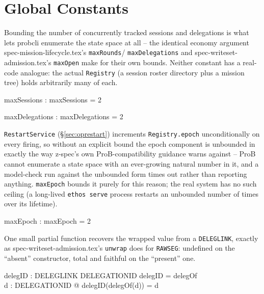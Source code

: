 \documentclass[a4paper,10pt,fleqn]{article}
\newcommand{\field}[1]{\texttt{#1}}
\begin{document}
\section{Global Constants}
\label{sec:constants}

Bounding the number of concurrently tracked sessions and delegations is
what lets probcli enumerate the state space at all -- the identical
economy argument spec-mission-lifecycle.tex's \field{maxRounds}/
\field{maxDelegations} and spec-writeset-admission.tex's \field{maxOpen}
make for their own bounds. Neither constant has a real-code analogue:
the actual \field{Registry} (a session roster directory plus a mission
tree) holds arbitrarily many of each.

\begin{axdef}
maxSessions : \nat
\where
maxSessions = 2
\end{axdef}

\begin{axdef}
maxDelegations : \nat
\where
maxDelegations = 2
\end{axdef}

\field{RestartService} (\S\ref{sec:oprestart}) increments
\field{Registry.epoch} unconditionally on every firing, so without an
explicit bound the epoch component is unbounded in exactly the way
z-spec's own ProB-compatibility guidance warns against -- ProB cannot
enumerate a state space with an ever-growing natural number in it, and
a model-check run against the unbounded form times out rather than
reporting anything. \field{maxEpoch} bounds it purely for this reason;
the real system has no such ceiling (a long-lived \field{ethos serve}
process restarts an unbounded number of times over its lifetime).

\begin{axdef}
maxEpoch : \nat
\where
maxEpoch = 2
\end{axdef}

One small partial function recovers the wrapped value from a
\field{DELEGLINK}, exactly as spec-writeset-admission.tex's
\field{unwrap} does for \field{RAWSEG}: undefined on the ``absent''
constructor, total and faithful on the ``present'' one.

\begin{axdef}
delegID : DELEGLINK \pfun DELEGATIONID
\where
\dom delegID = \ran delegOf \\
\forall d : DELEGATIONID @ delegID(delegOf(d)) = d
\end{axdef}
\end{document}
